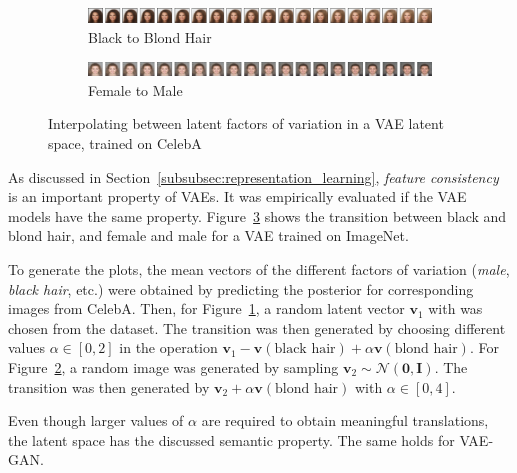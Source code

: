 \begin{figure}
    \centering
    \begin{subfigure}{\textwidth}
        \includegraphics[width=\textwidth]{images/latent_space_traversals/vae_celeba_black_to_blond.png}
        \caption{Black to Blond Hair}
        \label{subfig:black_to_blond}
    \end{subfigure}
    \begin{subfigure}{\textwidth}
        \includegraphics[width=\textwidth]{images/latent_space_traversals/vae_celeba_man_to_woman.png}
        \caption{Female to Male}
        \label{subfig:female_to_male}
    \end{subfigure}
    \caption[Interpolating between black and blond hair, man and woman]{Interpolating between latent factors of variation in a \ac{VAE} latent space, trained on CelebA}
    \label{fig:vae_celeba_black_to_blond_man_to_woman}
\end{figure}

As discussed in Section~\ref{subsubsec:representation_learning}, \textit{feature consistency} is an important property of \acp{VAE}.
It was empirically evaluated if the \ac{VAE} models have the same property.
Figure~\ref{fig:vae_celeba_black_to_blond_man_to_woman} shows the transition between black and blond hair, and female and male for a \ac{VAE} trained on ImageNet.

To generate the plots, the mean vectors of the different factors of variation (\textit{male}, \textit{black hair}, etc.) were obtained by predicting the posterior for corresponding images from CelebA.
Then, for Figure~\ref{subfig:black_to_blond}, a random latent vector $\bm{v}_1$ with  was chosen from the dataset.
The transition was then generated by choosing different values $\alpha \in [0, 2]$ in the operation $\bm{v}_1 - \bm{v}(\text{black hair}) + \alpha\bm{v}(\text{blond hair})$.
For Figure~\ref{subfig:female_to_male}, a random image was generated by sampling $\bm{v}_2\sim \mathcal{N}(\bm{0}, \bm{I})$.
The transition was then generated by $\bm{v}_2 + \alpha\bm{v}(\text{blond hair})$ with $\alpha \in [0, 4]$.

Even though larger values of $\alpha$ are required to obtain meaningful translations, the latent space has the discussed semantic property.
The same holds for \ac{VAE}-\ac{GAN}.

